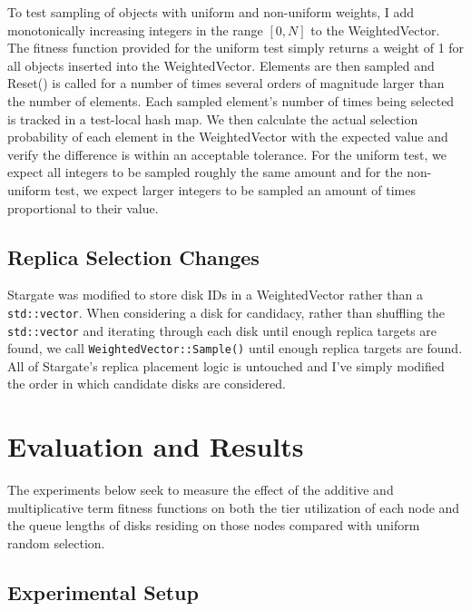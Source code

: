 \documentclass[12pt]{article}
\begin{document}
    To test sampling of objects with uniform and non-uniform weights, I add
    monotonically increasing integers in the range $[0,N]$ to the
    WeightedVector. The fitness function provided for the uniform test simply
    returns a weight of 1 for all objects inserted into the WeightedVector.
    Elements are then sampled and Reset() is called for a number of times
    several orders of magnitude larger than the number of elements. Each
    sampled element's number of times being selected is tracked in a test-local
    hash map. We then calculate the actual selection probability of each
    element in the WeightedVector with the expected value and verify the
    difference is within an acceptable tolerance. For the uniform test, we
    expect all integers to be sampled roughly the same amount and for the
    non-uniform test, we expect larger integers to be sampled an amount of
    times proportional to their value.

  \subsection{Replica Selection Changes}
    
  Stargate was modified to store disk IDs in a WeightedVector rather than a
  \verb|std::vector|. When considering a disk for candidacy, rather than
  shuffling the \verb|std::vector| and iterating through each disk until enough
  replica targets are found, we call \verb|WeightedVector::Sample()| until
  enough replica targets are found. All of Stargate's replica placement logic
  is untouched and I've simply modified the order in which candidate disks are
  considered.
      

\newpage
\section{Evaluation and Results}

The experiments below seek to measure the effect of the additive and
multiplicative term fitness functions on both the tier utilization of each node
and the queue lengths of disks residing on those nodes compared with uniform
random selection.

  \subsection{Experimental Setup}
\end{document}

